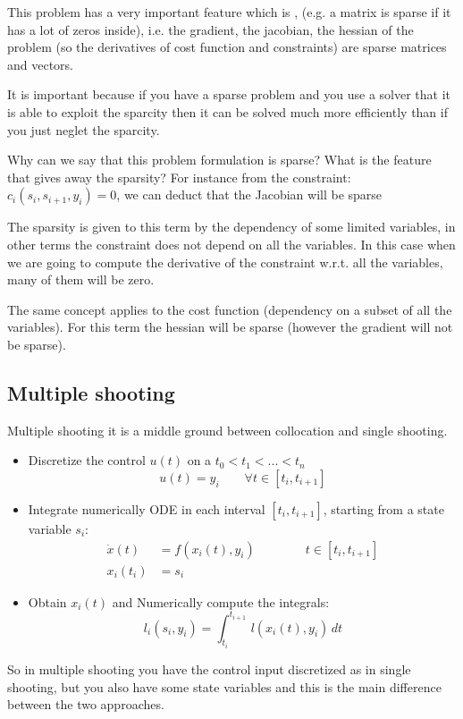 This problem has a very important feature which is , (e.g. a matrix is sparse if it has a lot of zeros inside), i.e. the gradient, the jacobian, the hessian of the problem (so the derivatives of cost function and constraints) are sparse matrices and vectors.

It is important because if you have a sparse problem and you use a solver that it is able to exploit the sparcity then it can be solved much more efficiently than if you just neglet the sparcity.

Why can we say  that this problem formulation is sparse?  What is the feature that gives away the sparsity?
For instance from the constraint: $c_i(s_i, s_{i+1}, y_i) = 0$, we can deduct that the Jacobian will be sparse

The sparsity is given to this term by the dependency of some limited variables, in other terms the constraint does not depend on all the variables. In this case when we are going to compute the derivative of the constraint w.r.t. all the variables, many of them will be zero.

The same concept applies to the cost function (dependency on a subset of all the variables). For this term the hessian will be sparse (however the gradient will not be sparse).

\subsection{Multiple shooting}
Multiple shooting it is a middle ground between collocation and single shooting.

\begin{itemize}
\item Discretize the control $u(t)$ on a  $t_0 < t_1 < ... < t_n$
\[u(t) = y_i \qquad\forall t \in [t_i, t_{i+1}]\]
\item Integrate numerically ODE in each interval $[t_i, t_{i+1}]$, starting from a state variable $s_i$:
\begin{align*}
\dot{x}(t) &= f(x_i(t), y_i)\qquad\qquad t\in [t_i, t_{i+1}]\\
x_i(t_i) &= s_i
\end{align*}
\item Obtain $x_i(t)$ and Numerically compute the integrals:
\[l_i(s_i, y_i) = \int_{t_i}^{t_{i+1}}\,l(x_i(t), y_i)\,dt\]
\end{itemize}
So in multiple shooting you have the control input discretized as in single shooting, but you also have some state variables and this is the main difference between the two approaches.

